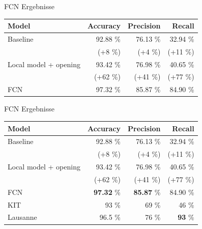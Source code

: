 \begin{frame}{FCN Ergebnisse}
    \begin{table}
    \begin{tabular}{lrrr}
    \toprule
    \textbf{Model}        & \textbf{Accuracy} & \textbf{Precision} & \textbf{Recall}   \\ \midrule
    Baseline              & 92.88 \%          & 76.13 \%         & 32.94 \% \\
                          & {\tiny (+8 \%)}   & {\tiny (+4 \%)}  & {\tiny (+11 \%)}\\
    Local model + opening & 93.42 \%          & 76.98 \%         & 40.65 \% \\
                          & {\tiny (+62 \%)}  & {\tiny (+41 \%)} & {\tiny (+77 \%)}\\
    FCN                   & 97.32 \%          & 85.87 \%         & 84.90 \% \\ \bottomrule
    \end{tabular}
    \end{table}
\end{frame}

\begin{frame}{FCN Ergebnisse}
    \begin{table}
    \begin{tabular}{lrrr}
    \toprule
    \textbf{Model}        & \textbf{Accuracy} & \textbf{Precision} & \textbf{Recall}   \\ \midrule
    Baseline              & 92.88 \%          & 76.13 \%         & 32.94 \% \\
                          & {\tiny (+8 \%)}   & {\tiny (+4 \%)}  & {\tiny (+11 \%)}\\
    Local model + opening & 93.42 \%          & 76.98 \%         & 40.65 \% \\
                          & {\tiny (+62 \%)}  & {\tiny (+41 \%)} & {\tiny (+77 \%)}\\
    FCN                   & \textbf{97.32} \% & \textbf{85.87} \%& 84.90 \% \\ \midrule
    KIT                   & 93 \%             & 69 \%            & 46 \% \\
    Lausanne              & 96.5 \%           & 76 \%            & \textbf{93} \% \\
    \bottomrule
    \end{tabular}
    \end{table}
\end{frame}
